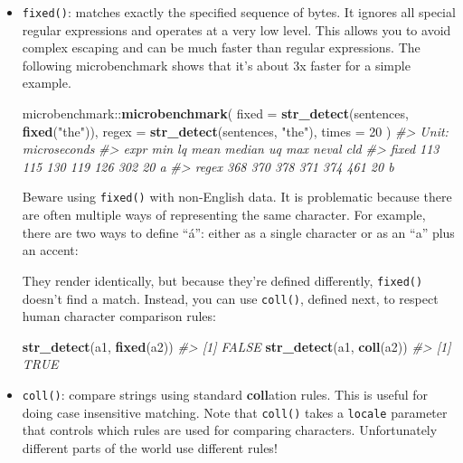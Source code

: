 \documentclass[]{book}
\newenvironment{Shaded}{\begin{snugshade}}{\end{snugshade}}
\newcommand{\KeywordTok}[1]{\textcolor[rgb]{0.13,0.29,0.53}{\textbf{{#1}}}}
\newcommand{\DataTypeTok}[1]{\textcolor[rgb]{0.13,0.29,0.53}{{#1}}}
\newcommand{\DecValTok}[1]{\textcolor[rgb]{0.00,0.00,0.81}{{#1}}}
\newcommand{\StringTok}[1]{\textcolor[rgb]{0.31,0.60,0.02}{{#1}}}
\newcommand{\CommentTok}[1]{\textcolor[rgb]{0.56,0.35,0.01}{\textit{{#1}}}}
\newcommand{\NormalTok}[1]{{#1}}
\begin{document}
\begin{itemize}
\item
  \texttt{fixed()}: matches exactly the specified sequence of bytes. It
  ignores all special regular expressions and operates at a very low
  level. This allows you to avoid complex escaping and can be much
  faster than regular expressions. The following microbenchmark shows
  that it's about 3x faster for a simple example.

\begin{Shaded}
\begin{Highlighting}[]
\NormalTok{microbenchmark::}\KeywordTok{microbenchmark}\NormalTok{(}
  \DataTypeTok{fixed =} \KeywordTok{str_detect}\NormalTok{(sentences, }\KeywordTok{fixed}\NormalTok{(}\StringTok{"the"}\NormalTok{)),}
  \DataTypeTok{regex =} \KeywordTok{str_detect}\NormalTok{(sentences, }\StringTok{"the"}\NormalTok{),}
  \DataTypeTok{times =} \DecValTok{20}
\NormalTok{)}
\CommentTok{#> Unit: microseconds}
\CommentTok{#>   expr min  lq mean median  uq max neval cld}
\CommentTok{#>  fixed 113 115  130    119 126 302    20  a }
\CommentTok{#>  regex 368 370  378    371 374 461    20   b}
\end{Highlighting}
\end{Shaded}

  Beware using \texttt{fixed()} with non-English data. It is problematic
  because there are often multiple ways of representing the same
  character. For example, there are two ways to define ``á'': either as
  a single character or as an ``a'' plus an accent:


  They render identically, but because they're defined differently,
  \texttt{fixed()} doesn't find a match. Instead, you can use
  \texttt{coll()}, defined next, to respect human character comparison
  rules:

\begin{Shaded}
\begin{Highlighting}[]
\KeywordTok{str_detect}\NormalTok{(a1, }\KeywordTok{fixed}\NormalTok{(a2))}
\CommentTok{#> [1] FALSE}
\KeywordTok{str_detect}\NormalTok{(a1, }\KeywordTok{coll}\NormalTok{(a2))}
\CommentTok{#> [1] TRUE}
\end{Highlighting}
\end{Shaded}
\item
  \texttt{coll()}: compare strings using standard \textbf{coll}ation
  rules. This is useful for doing case insensitive matching. Note that
  \texttt{coll()} takes a \texttt{locale} parameter that controls which
  rules are used for comparing characters. Unfortunately different parts
  of the world use different rules!


\end{itemize}
\end{document}
